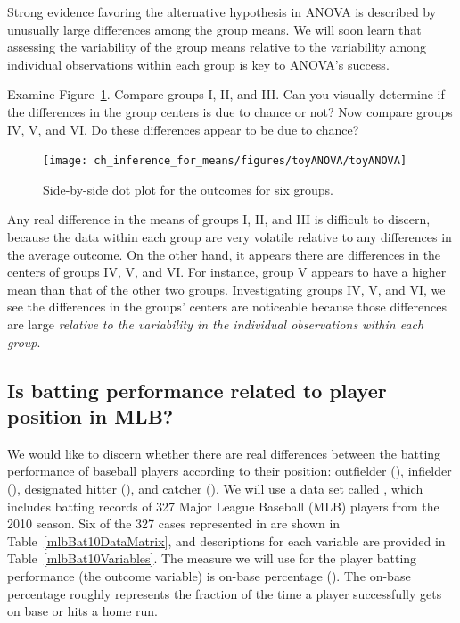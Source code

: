 Strong evidence favoring the alternative hypothesis in ANOVA is described by unusually large differences among the group means. We will soon learn that assessing the variability of the group means relative to the variability among individual observations within each group is key to ANOVA's success.

\textA{\pagebreak}

\begin{example}{Examine Figure~\ref{toyANOVA}. Compare groups I, II, and III. Can you visually determine if the differences in the group centers is due to chance or not? Now compare groups IV, V, and VI. Do these differences appear to be due to chance?}

\begin{figure}[h]
\centering
\texttt{[image: ch\_inference\_for\_means/figures/toyANOVA/toyANOVA]}
\caption{Side-by-side dot plot for the outcomes for six groups.}
\label{toyANOVA}
\end{figure}

Any real difference in the means of groups I, II, and III is difficult to discern, because the data within each group are very volatile relative to any differences in the average outcome. On the other hand, it appears there are differences in the centers of groups IV, V, and VI. For instance, group V appears to have a higher mean than that of the other two groups. Investigating groups IV, V, and VI, we see the differences in the groups' centers are noticeable because those differences are large \emph{relative to the variability in the individual observations within each group}.
\end{example}


\subsection{Is batting performance related to player position in MLB?}


We would like to discern whether there are real differences between the batting performance of baseball players according to their position: outfielder (), infielder (), designated hitter (), and catcher (). We will use a data set called , which includes batting records of 327 Major League Baseball (MLB) players from the 2010 season. Six of the 327 cases represented in  are shown in Table~\ref{mlbBat10DataMatrix}, and descriptions for each variable are provided in Table~\ref{mlbBat10Variables}. The measure we will use for the player batting performance (the outcome variable) is on-base percentage (). The on-base percentage roughly represents the fraction of the time a player successfully gets on base or hits a home run.

